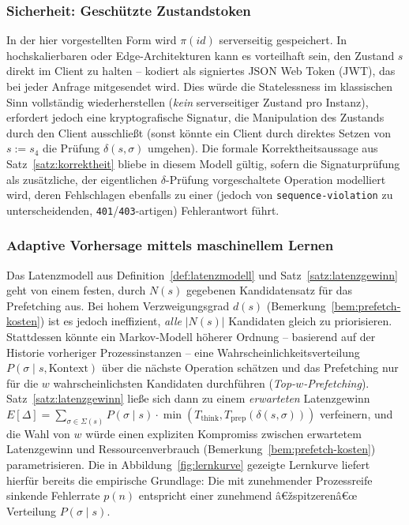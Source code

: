 ﻿\documentclass[a4paper,12pt]{article}
\theoremstyle{definition}
\begin{document}
\subsubsection{Sicherheit: Geschützte Zustandstoken}

In der hier vorgestellten Form wird $\pi(id)$ serverseitig gespeichert. In hochskalierbaren
oder Edge-Architekturen kann es vorteilhaft sein, den Zustand $s$ direkt im Client zu
halten -- kodiert als signiertes JSON Web Token (JWT), das bei jeder Anfrage mitgesendet
wird. Dies würde die Statelessness im klassischen Sinn vollständig wiederherstellen
(\emph{kein} serverseitiger Zustand pro Instanz), erfordert jedoch eine kryptografische
Signatur, die Manipulation des Zustands durch den Client ausschließt (sonst könnte ein
Client durch direktes Setzen von $s:=s_4$ die Prüfung $\delta(s,\sigma)$ umgehen). Die
formale Korrektheitsaussage aus Satz~\ref{satz:korrektheit} bliebe in diesem Modell
gültig, sofern die Signaturprüfung als zusätzliche, der eigentlichen
$\delta$-Prüfung vorgeschaltete Operation modelliert wird, deren Fehlschlagen ebenfalls zu
einer (jedoch von \texttt{sequence-violation} zu unterscheidenden,
\texttt{401}/\texttt{403}-artigen) Fehlerantwort führt.

\subsubsection{Adaptive Vorhersage mittels maschinellem Lernen}

Das Latenzmodell aus Definition~\ref{def:latenzmodell} und Satz~\ref{satz:latenzgewinn}
geht von einem festen, durch $N(s)$ gegebenen Kandidatensatz für das Prefetching aus. Bei
hohem Verzweigungsgrad $d(s)$ (Bemerkung~\ref{bem:prefetch-kosten}) ist es jedoch
ineffizient, \emph{alle} $|N(s)|$ Kandidaten gleich zu priorisieren. Stattdessen könnte ein
Markov-Modell höherer Ordnung -- basierend auf der Historie vorheriger Prozessinstanzen --
eine Wahrscheinlichkeitsverteilung $P(\sigma \mid s, \text{Kontext})$ über die nächste
Operation schätzen und das Prefetching nur für die $w$ wahrscheinlichsten Kandidaten
durchführen (\emph{Top-$w$-Prefetching}). Satz~\ref{satz:latenzgewinn} ließe sich dann zu
einem \emph{erwarteten} Latenzgewinn
$E[\Delta] = \sum_{\sigma\in\Sigma(s)} P(\sigma\mid s)\cdot
\min(T_{\mathrm{think}},T_{\mathrm{prep}}(\delta(s,\sigma)))$ verfeinern, und die Wahl von
$w$ würde einen expliziten Kompromiss zwischen erwartetem Latenzgewinn und
Ressourcenverbrauch (Bemerkung~\ref{bem:prefetch-kosten}) parametrisieren. Die in
Abbildung~\ref{fig:lernkurve} gezeigte Lernkurve liefert hierfür bereits die empirische
Grundlage: Die mit zunehmender Prozessreife sinkende Fehlerrate $p(n)$ entspricht einer
zunehmend â€žspitzerenâ€œ Verteilung $P(\sigma\mid s)$.
\end{document}
